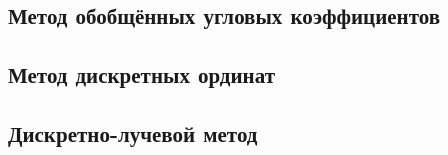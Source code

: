 \subsection{Метод обобщённых угловых коэффициентов}

\subsection{Метод дискретных ординат}

\subsection{Дискретно-лучевой метод}

\def\wA{5mm}
\def\wB{28mm}
\def\wC{23mm}
\def\wD{23mm}
\def\wE{23mm}
\def\wF{23mm}
\def\wG{23mm}
\def\wH{22mm}
\def\wI{22mm}
\def\wJ{22mm}
